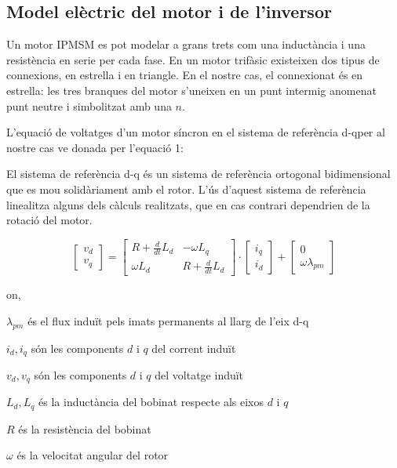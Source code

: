 \subsection{ Model elèctric del motor i de l'inversor }
{
    Un motor IPMSM es pot modelar a grans trets com una inductància i una
    resistència en serie per cada fase. En un motor trifàsic existeixen dos
    tipus de connexions, en estrella i en triangle. En el nostre cas, el
    connexionat és en estrella: les tres branques del motor s'uneixen en un
    punt intermig anomenat punt neutre i simbolitzat amb una $n$.

    L'equació de voltatges d'un motor síncron en el sistema de referència
    d-q\footnotemark per al nostre cas ve donada per l'equació 1:

    \footnotetext
    {   
        El sistema de referència d-q és un sistema de referència ortogonal
        bidimensional que es mou solidàriament amb el rotor. L'ús d'aquest
        sistema de referència linealitza alguns dels càlculs realitzats, que en
        cas contrari dependrien de la rotació del motor.
    }
    
    \begin{equation}
        \begin{bmatrix} v_d \\[5pt] v_q \end{bmatrix} =
        \begin{bmatrix}
            { R + \frac{d}{dt} L_d } & { -\omega L_q } \\[5pt]
            { \omega L_d } & { R + \frac{d}{dt} L_d }
        \end{bmatrix}
        \cdot \begin{bmatrix} i_q \\[5pt] i_d \end{bmatrix}
        + \begin{bmatrix} 0 \\[5pt] \omega \lambda_{pm} \end{bmatrix}
    \end{equation}

    on,
    \begin{description}
    {
        \item $\lambda_{pm}$ és el flux induït pels imats permanents al llarg de
        l'eix d-q
        \item $i_d, i_q$ són les components $d$ i $q$ del corrent induït
        \item $v_d, v_q$ són les components $d$ i $q$ del voltatge induït
        \item $L_d, L_q$ és la inductància del bobinat respecte als eixos $d$ i
        $q$
        \item $R$ és la resistència del bobinat
        \item $\omega$ és la velocitat angular del rotor
    }
    \end{description}

}
